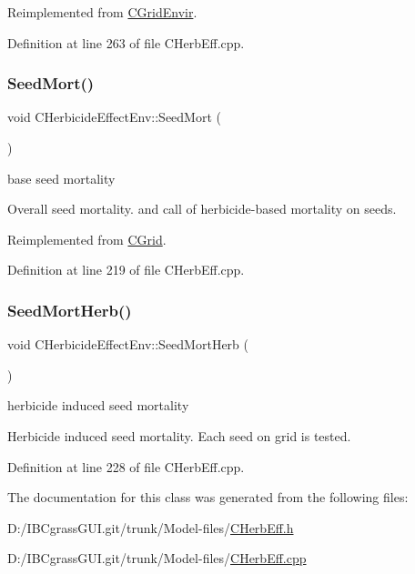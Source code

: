 Reimplemented from \mbox{\hyperlink{class_c_grid_envir_ae7d159245558c84daa3eadd057c31c4e}{C\+Grid\+Envir}}.



Definition at line 263 of file C\+Herb\+Eff.\+cpp.

\mbox{\label{class_c_herbicide_effect_env_aa325ab8688e1e1bbe060da4b2031cd44}} 
\subsubsection{\texorpdfstring{SeedMort()}{SeedMort()}}
{\footnotesize\ttfamily void C\+Herbicide\+Effect\+Env\+::\+Seed\+Mort (\begin{DoxyParamCaption}{ }\end{DoxyParamCaption})\hspace{0.3cm}{\ttfamily [virtual]}}



base seed mortality 

Overall seed mortality. and call of herbicide-\/based mortality on seeds. 

Reimplemented from \mbox{\hyperlink{class_c_grid_ad39e5ec82353d218a0a6d469ce2a88e1}{C\+Grid}}.



Definition at line 219 of file C\+Herb\+Eff.\+cpp.

\mbox{\label{class_c_herbicide_effect_env_a88180a174d738b7a5e2e3bdcdd4b8635}} 
\subsubsection{\texorpdfstring{SeedMortHerb()}{SeedMortHerb()}}
{\footnotesize\ttfamily void C\+Herbicide\+Effect\+Env\+::\+Seed\+Mort\+Herb (\begin{DoxyParamCaption}{ }\end{DoxyParamCaption})}



herbicide induced seed mortality 

Herbicide induced seed mortality. Each seed on grid is tested. 

Definition at line 228 of file C\+Herb\+Eff.\+cpp.



The documentation for this class was generated from the following files\+:\begin{DoxyCompactItemize}
\item 
D\+:/\+I\+B\+Cgrass\+G\+U\+I.\+git/trunk/\+Model-\/files/\mbox{\hyperlink{_c_herb_eff_8h}{C\+Herb\+Eff.\+h}}\item 
D\+:/\+I\+B\+Cgrass\+G\+U\+I.\+git/trunk/\+Model-\/files/\mbox{\hyperlink{_c_herb_eff_8cpp}{C\+Herb\+Eff.\+cpp}}\end{DoxyCompactItemize}
